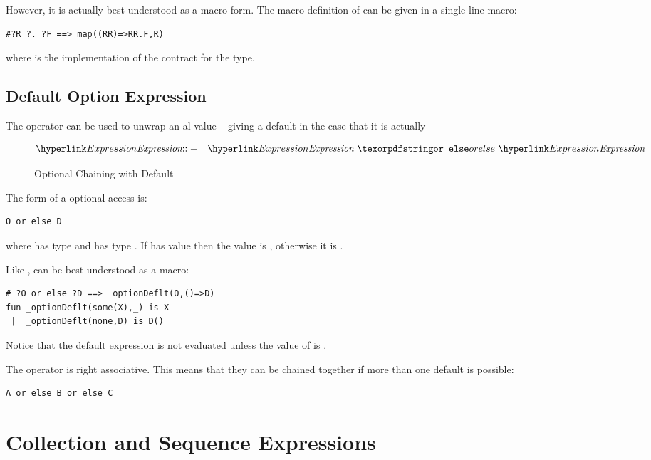 However, it is actually best understood as a macro form. The macro definition of  can be given in a single line macro:
\begin{lstlisting}
#?R ?. ?F ==> map((RR)=>RR.F,R)
\end{lstlisting}
where  is the implementation of the  contract for the  type.

\subsection{Default Option Expression -- }
\label{optionDefltChain}

The  operator can be used to unwrap an al value -- giving a default in the case that it is actually  

\begin{figure}[htbp]
\begin{eqnarray*}
\ntRef{Expression}&\arrowplus&\ntRef{Expression}\ \q{or else}\ \ntRef{Expression}
\end{eqnarray*}
\caption{Optional Chaining with Default}\label{optionIndexAccessFig}
\end{figure}

The form of a optional access is:
\begin{lstlisting}
O or else D
\end{lstlisting}
where  has type  and  has type . If  has value  then the value is , otherwise it is .

Like ,  can be best understood as a macro:
\begin{lstlisting}
# ?O or else ?D ==> _optionDeflt(O,()=>D)
fun _optionDeflt(some(X),_) is X
 |  _optionDeflt(none,D) is D()
\end{lstlisting}
Notice that the default expression is not evaluated unless the value of  is .

The  operator is right associative. This means that they can be chained  together if more than one default is possible:
\begin{lstlisting}
A or else B or else C
\end{lstlisting}

\section{Collection and Sequence Expressions}
\label{sequenceExpression}


